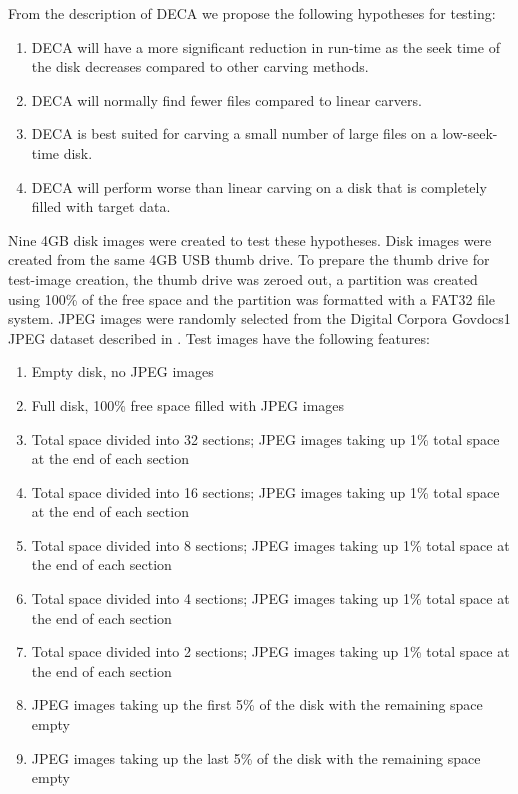 \documentclass[final,5p,times,twocolumn,authoryear]{elsarticle}
\begin{document}
From the description of DECA we propose the following hypotheses for testing:
\begin{enumerate}
	\item DECA will have a more significant reduction in run-time as the seek time of the disk decreases compared to other carving methods.
	\item DECA will normally find fewer files compared to linear carvers.
	\item DECA is best suited for carving a small number of large files on a low-seek-time disk.
	\item DECA will perform worse than linear carving on a disk that is completely filled with target data.
\end{enumerate}

Nine 4GB disk images were created to test these hypotheses. Disk images were created from the same 4GB USB thumb drive. To prepare the thumb drive for test-image creation, the thumb drive was zeroed out, a partition was created using 100\% of the free space and the partition was formatted with a FAT32 file system. JPEG images were randomly selected from the Digital Corpora Govdocs1 JPEG dataset described in \cite{Garfinkel2009}. Test images have the following features:

\begin{enumerate}
	\item Empty disk, no JPEG images
	\item Full disk, 100\% free space filled with JPEG images
	\item Total space divided into 32 sections; JPEG images taking up 1\% total space at the end of each section
	\item Total space divided into 16 sections; JPEG images taking up 1\% total space at the end of each section
	\item Total space divided into 8 sections; JPEG images taking up 1\% total space at the end of each section
	\item Total space divided into 4 sections; JPEG images taking up 1\% total space at the end of each section
	\item Total space divided into 2 sections; JPEG images taking up 1\% total space at the end of each section
	\item JPEG images taking up the first 5\% of the disk with the remaining space empty
	\item JPEG images taking up the last 5\% of the disk with the remaining space empty
\end{enumerate}
\end{document}
